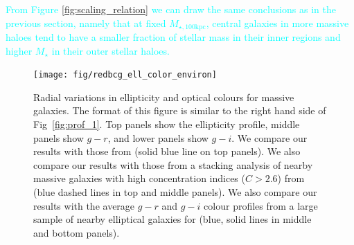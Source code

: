 \documentclass[a4paper,fleqn,usenatbib]{mnras}
\def\mstar{{$M_{\star}$}}
\def\minn{{$M_{\star,10\mathrm{kpc}}$}}
\def\mtot{{$M_{\star,100\mathrm{kpc}}$}}
\def\mden{{$\mu_{\star}$}}
\newcommand{\song}[1]{\textcolor{cyan}{#1}}
\begin{document}
    \song{
    From Figure \ref{fig:scaling_relation} we can draw the same conclusions as in 
    the previous section, namely that at fixed \mtot{}, central galaxies in more massive 
    haloes tend to have a smaller fraction of stellar mass in their inner regions and 
    higher \mstar{} in their outer stellar haloes.  
    }
    
    
     

  \begin{figure}
      \centering 
      \texttt{[image: fig/redbcg\_ell\_color\_environ]}
      \caption{
          Radial variations in ellipticity and optical colours for massive galaxies. 
          The format of this figure is similar to the right hand side of 
          Fig~\ref{fig:prof_1}. 
          Top panels show the ellipticity profile, middle panels show $g-r$, and lower 
          panels show $g-i$. 
          We compare our results with those from \citet{Tal2011}
          (solid blue line on top panels). 
          We also compare our results with those from a stacking analysis of nearby 
          massive galaxies with high concentration indices ($C>2.6$) from 
          \citet{DSouza2014} (blue dashed lines in top and middle panels). 
          We also compare our results with the average $g-r$ and $g-i$ colour profiles 
          from a large sample of nearby elliptical galaxies for \citet{LaBarbera2010}
          (blue, solid lines in middle and bottom panels).
          }
      \label{fig:ell_color}
  \end{figure}
\end{document}
